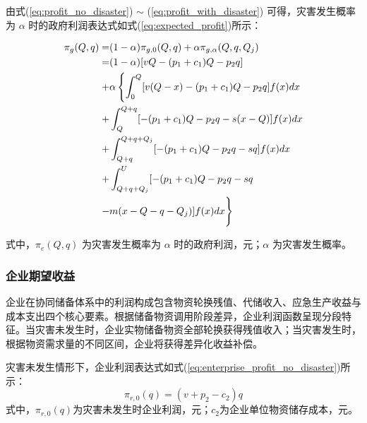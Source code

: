 \documentclass[a4paper,8pt,twocolumn]{article} %
\begin{document}
由式(\ref{eq:profit_no_disaster}) $\sim$ (\ref{eq:profit_with_disaster}) 可得，灾害发生概率为 $\alpha$ 时的政府利润表达式如式(\ref{eq:expected_profit})所示：
\begin{small}
\begin{align} \label{eq:expected_profit}
\pi_g(Q,q) = & (1-\alpha) \pi_{g,0}(Q,q) + \alpha \pi_{g,\alpha}(Q,q, Q_j) \notag \\
= & (1-\alpha) [v Q - (p_1+c_1)Q - p_2q] \notag \\
+ & \alpha \left\{ \int_0^Q [v(Q-x) - (p_1+c_1)Q - p_2q] f(x)dx \right. \notag \\
+ & \int_Q^{Q+q} [-(p_1+c_1)Q - p_2q - s(x-Q)] f(x)dx \notag \\
+ & \int_{Q+q}^{Q+q+Q_j} [-(p_1+c_1)Q - p_2q - sq] f(x)dx \notag \\
+ & \int_{Q+q+Q_j}^U [-(p_1+c_1)Q - p_2q - sq \notag \\
- & m(x-Q-q-Q_j)] f(x)dx \Biggr\}
\end{align}
\end{small}
式中，$\pi_e(Q,q)$ 为灾害发生概率为 $\alpha$ 时的政府利润，元；$\alpha$ 为灾害发生概率。
\subsubsection{企业期望收益}
企业在协同储备体系中的利润构成包含物资轮换残值、代储收入、应急生产收益与成本支出四个核心要素。根据储备物资调用阶段差异，企业利润函数呈现分段特征。当灾害未发生时，企业实物储备物资全部轮换获得残值收入；当灾害发生时，根据物资需求量的不同区间，企业将获得差异化收益补偿。

灾害未发生情形下，企业利润表达式如式(\ref{eq:enterprise_profit_no_disaster})所示：
\begin{equation} \label{eq:enterprise_profit_no_disaster}
{\pi}_{r,0}(q) = (v + p_2 - c_2)q
\end{equation}
式中，$\pi_{r,0}(q)$为灾害未发生时企业利润，元；$c_2$为企业单位物资储存成本，元。
\end{document}
